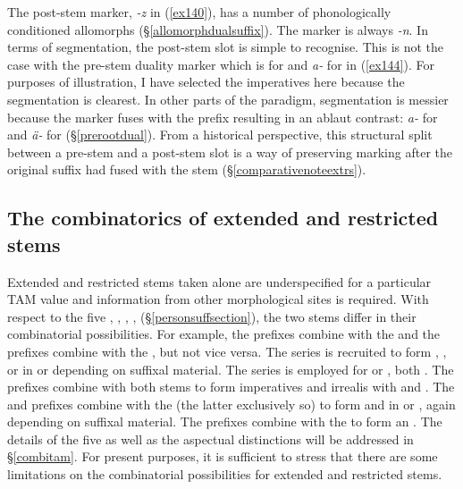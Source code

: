 The post-stem  marker, \emph{-z} in (\ref{ex140}), has a number of phonologically conditioned allomorphs ({\S}\ref{allomorphdualsuffix}). The  marker is always \emph{-n}. In terms of segmentation, the post-stem slot is simple to recognise. This is not the case with the pre-stem duality marker which is  for  and \emph{a-} for  in (\ref{ex144}). For purposes of illustration, I have selected the imperatives here because the segmentation is clearest. In other parts of the paradigm, segmentation is messier because the  marker fuses with the  prefix resulting in an ablaut contrast: \emph{a-} for  and \emph{ä-} for  ({\S}\ref{prerootdual}). From a historical perspective, this structural split between a pre-stem and a post-stem slot is a way of preserving  marking after the original suffix had fused with the stem ({\S}\ref{comparativenoteextrs}).

\subsection{The combinatorics of extended and restricted stems} \label{combinatoricsextrs}

Extended and restricted stems taken alone are underspecified for a particular TAM value and information from other morphological sites is required. With respect to the five  \Alph, \Bet{}, \Betaone{}, \Betatwo, \Gam{} ({\S}\ref{personsuffsection}), the two stems differ in their combinatorial possibilities. For example, the \Alph{} prefixes combine with the  and the \Gam{} prefixes combine with the , but not vice versa. The \Alph{} series is recruited to form , ,  or  in  or   depending on suffixal material. The \Gam{} series is employed for  or , both . The \Bet{} prefixes combine with both stems to form imperatives and irrealis with  and  . The \Betaone{} and \Betatwo{} prefixes combine with the  (the latter exclusively so) to form  and  in  or  , again depending on suffixal material. The \Betaone{} prefixes combine with the  to form an . The details of the five  as well as the aspectual distinctions will be addressed in {\S}\ref{combitam}. For present purposes, it is sufficient to stress that there are some limitations on the combinatorial possibilities for extended and restricted stems.

